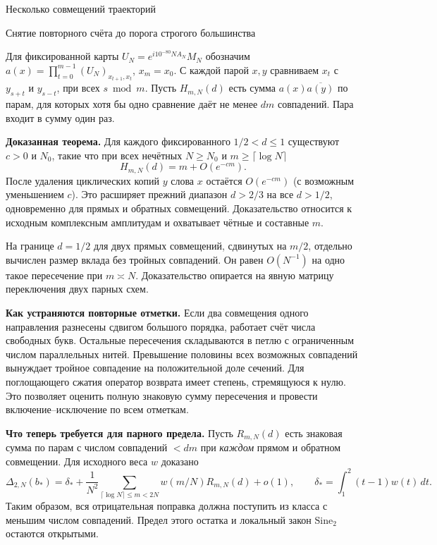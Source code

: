 \documentclass[11pt,a4paper]{article}
\newcommand{\subt}[1]{\par\medskip\noindent\textbf{#1.}\quad}
\begin{document}
\raggedright
{}
\begin{center}{\LARGE\sffamily Несколько совмещений траекторий}\par\vspace{4pt}
{\large Снятие повторного счёта до порога строгого большинства}
\end{center}

Для фиксированной карты \(U_N=e^{i10^{-80}NA_N}M_N\) обозначим
\(a(x)=\prod_{t=0}^{m-1}(U_N)_{x_{t+1},x_t}\), \(x_m=x_0\).
С каждой парой \(x,y\) сравниваем \(x_t\) с \(y_{s+t}\) и \(y_{s-t}\), при всех \(s\bmod m\).
Пусть \(H_{m,N}(d)\) есть сумма \(a(x)\overline{a(y)}\) по парам, для которых хотя бы одно сравнение даёт не менее \(dm\) совпадений. Пара входит в сумму один раз.

\subt{Доказанная теорема}
Для каждого фиксированного \(1/2<d\le1\) существуют \(c>0\) и \(N_0\), такие что при всех нечётных \(N\ge N_0\) и \(m\ge\lceil\log N\rceil\)
\[
           H_{m,N}(d)=m+O(e^{-cm}).
\]
После удаления циклических копий \(y\) слова \(x\) остаётся \(O(e^{-cm})\) (с возможным уменьшением \(c\)). Это расширяет прежний диапазон \(d>2/3\) на все \(d>1/2\), одновременно для прямых и обратных совмещений. Доказательство относится к исходным комплексным амплитудам и охватывает чётные и составные \(m\).

На границе \(d=1/2\) для двух прямых совмещений, сдвинутых на \(m/2\), отдельно вычислен размер вклада без тройных совпадений. Он равен \(O(N^{-1})\) на одно такое пересечение при \(m\asymp N\). Доказательство опирается на явную матрицу переключения двух парных схем.

\subt{Как устраняются повторные отметки}
Если два совмещения одного направления разнесены сдвигом большого порядка, работает счёт числа свободных букв. Остальные пересечения складываются в петлю с ограниченным числом параллельных нитей. Превышение половины всех возможных совпадений вынуждает тройное совпадение на положительной доле сечений. Для поглощающего сжатия оператор возврата имеет степень, стремящуюся к нулю. Это позволяет оценить полную знаковую сумму пересечения и провести включение--исключение по всем отметкам.

\subt{Что теперь требуется для парного предела}
Пусть \(R_{m,N}(d)\) есть знаковая сумма по парам с числом совпадений \(<dm\) при \emph{каждом} прямом и обратном совмещении. Для исходного веса \(w\) доказано
\[
 \Delta_{2,N}(b_*)=\delta_*+
     \frac1{N^2}\sum_{\lceil\log N\rceil\le m<2N} w(m/N)R_{m,N}(d)+o(1),
      \qquad \delta_*=\int_1^2(t-1)w(t)\,dt .
\]
Таким образом, вся отрицательная поправка должна поступить из класса с меньшим числом совпадений. Предел этого остатка и локальный закон \(\mathrm{Sine}_2\) остаются открытыми.
\end{document}
